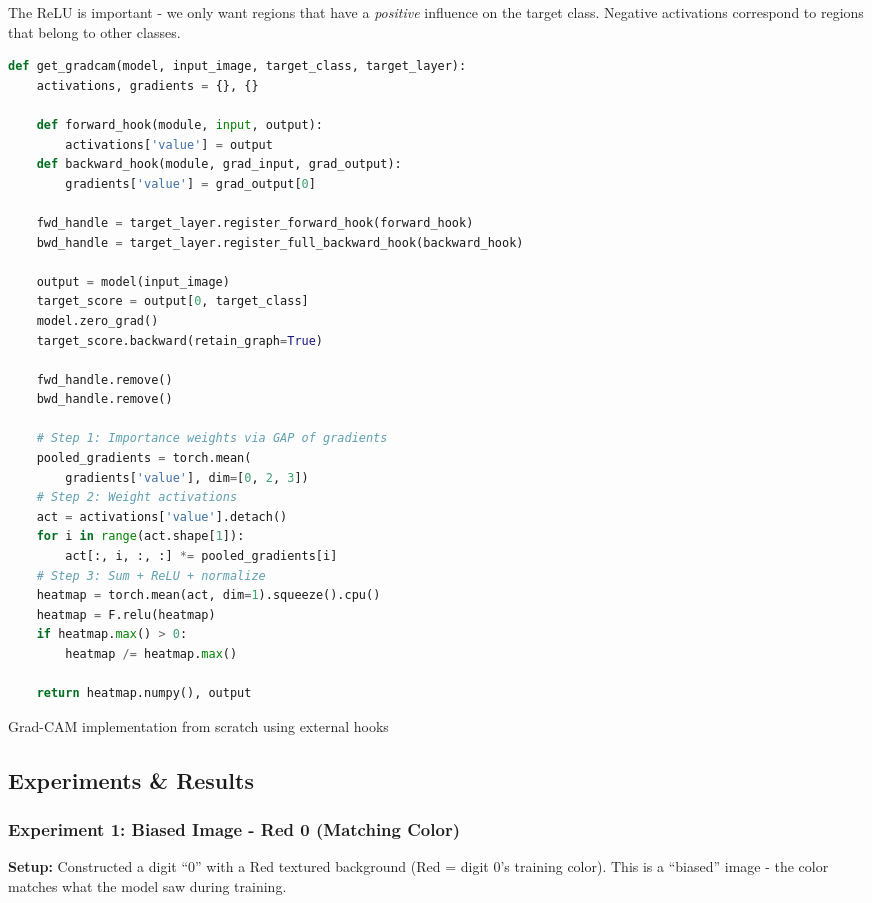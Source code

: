 \documentclass[9pt,a4paper,twocolumn,twoside]{tau-class/tau}
\begin{document}
        The ReLU is important - we only want regions that have a \textit{positive} influence on the target class. Negative activations correspond to regions that belong to other classes.

        \begin{code}
            \begin{lstlisting}[language=python]
def get_gradcam(model, input_image, target_class, target_layer):
    activations, gradients = {}, {}

    def forward_hook(module, input, output):
        activations['value'] = output
    def backward_hook(module, grad_input, grad_output):
        gradients['value'] = grad_output[0]

    fwd_handle = target_layer.register_forward_hook(forward_hook)
    bwd_handle = target_layer.register_full_backward_hook(backward_hook)

    output = model(input_image)
    target_score = output[0, target_class]
    model.zero_grad()
    target_score.backward(retain_graph=True)

    fwd_handle.remove()
    bwd_handle.remove()

    # Step 1: Importance weights via GAP of gradients
    pooled_gradients = torch.mean(
        gradients['value'], dim=[0, 2, 3])
    # Step 2: Weight activations
    act = activations['value'].detach()
    for i in range(act.shape[1]):
        act[:, i, :, :] *= pooled_gradients[i]
    # Step 3: Sum + ReLU + normalize
    heatmap = torch.mean(act, dim=1).squeeze().cpu()
    heatmap = F.relu(heatmap)
    if heatmap.max() > 0:
        heatmap /= heatmap.max()

    return heatmap.numpy(), output
            \end{lstlisting}
            \caption{Grad-CAM implementation from scratch using external hooks}
            \label{lst:gradcam}
        \end{code}

    \subsection{Experiments \& Results}

        \subsubsection{Experiment 1: Biased Image - Red 0 (Matching Color)}

        \textbf{Setup:} Constructed a digit ``0'' with a Red textured background (Red = digit 0's training color). This is a ``biased'' image - the color matches what the model saw during training.
\end{document}
